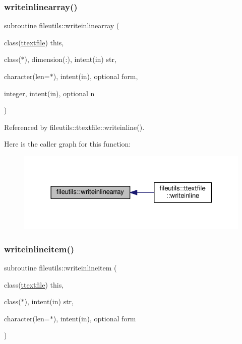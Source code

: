 \subsubsection{\texorpdfstring{writeinlinearray()}{writeinlinearray()}}
{\footnotesize\ttfamily subroutine fileutils\+::writeinlinearray (\begin{DoxyParamCaption}\item[{class(\mbox{\hyperlink{structfileutils_1_1ttextfile}{ttextfile}})}]{this,  }\item[{class($\ast$), dimension(\+:), intent(in)}]{str,  }\item[{character(len=$\ast$), intent(in), optional}]{form,  }\item[{integer, intent(in), optional}]{n }\end{DoxyParamCaption})\hspace{0.3cm}{\ttfamily [private]}}



Referenced by fileutils\+::ttextfile\+::writeinline().

Here is the caller graph for this function\+:
\nopagebreak
\begin{figure}[H]
\begin{center}
\leavevmode
\includegraphics[width=322pt]{namespacefileutils_a421b7722f368ba1dbf80589c8f944804_icgraph}
\end{center}
\end{figure}
\mbox{\label{namespacefileutils_af26bec360e1e147d731d1265d3b3e689}} 
\subsubsection{\texorpdfstring{writeinlineitem()}{writeinlineitem()}}
{\footnotesize\ttfamily subroutine fileutils\+::writeinlineitem (\begin{DoxyParamCaption}\item[{class(\mbox{\hyperlink{structfileutils_1_1ttextfile}{ttextfile}})}]{this,  }\item[{class($\ast$), intent(in)}]{str,  }\item[{character(len=$\ast$), intent(in), optional}]{form }\end{DoxyParamCaption})\hspace{0.3cm}{\ttfamily [private]}}



